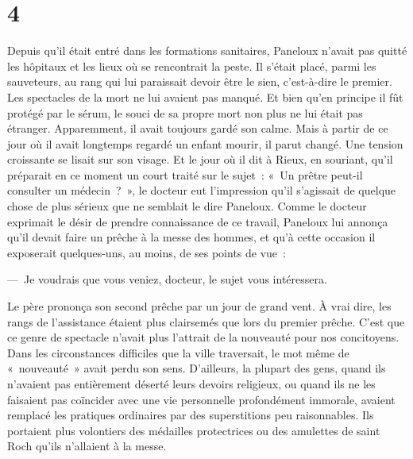 \documentclass[french,twoside]{book} %
\begin{document}
\section[{4}]{4}
\noindent Depuis qu’il était entré dans les formations sanitaires, Paneloux n’avait pas quitté les hôpitaux et les lieux où se rencontrait la peste. Il s’était placé, parmi les sauveteurs, au rang qui lui paraissait devoir être le sien, c’est-à-dire le premier. Les spectacles de la mort ne lui avaient pas manqué. Et bien qu’en principe il fût protégé par le sérum, le souci de sa propre mort non plus ne lui était pas étranger. Apparemment, il avait toujours gardé son calme. Mais à partir de ce jour où il avait longtemps regardé un enfant mourir, il parut changé. Une tension croissante se lisait sur son visage. Et le jour où il dit à Rieux, en souriant, qu’il préparait en ce moment un court traité sur le sujet : « Un prêtre peut-il consulter un médecin ? », le docteur eut l’impression qu’il s’agissait de quelque chose de plus sérieux que ne semblait le dire Paneloux. Comme le docteur exprimait le désir de prendre connaissance de ce travail, Paneloux lui annonça qu’il devait faire un prêche à la messe des hommes, et qu’à cette occasion il exposerait quelques-uns, au moins, de ses points de vue :\par
— Je voudrais que vous veniez, docteur, le sujet vous intéressera.\par
Le père prononça son second prêche par un jour de grand vent. À vrai dire, les rangs de l’assistance étaient plus clairsemés que lors du premier prêche. C’est que ce genre de spectacle n’avait plus l’attrait de la nouveauté pour nos concitoyens. Dans les circonstances difficiles que la ville traversait, le mot même de « nouveauté » avait perdu son sens. D’ailleurs, la plupart des gens, quand ils n’avaient pas entièrement déserté leurs devoirs religieux, ou quand ils ne les faisaient pas coïncider avec une vie personnelle profondément immorale, avaient remplacé les pratiques ordinaires par des superstitions peu raisonnables. Ils portaient plus volontiers des médailles protectrices ou des amulettes de saint Roch qu’ils n’allaient à la messe.\par
\end{document}
